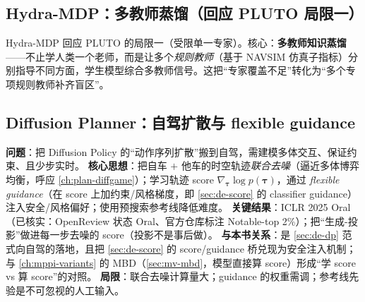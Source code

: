 \subsection{Hydra-MDP：多教师蒸馏（回应 PLUTO 局限一）}
\label{sec:de-hydra}

Hydra-MDP\cite{li2024hydramdp} 回应 PLUTO 的局限一（受限单一专家）。核心：\textbf{多教师知识蒸馏}——不止学人类一个老师，而是让多个\emph{规则教师}（基于 NAVSIM 仿真子指标）分别指导不同方面，学生模型综合多教师信号。这把“专家覆盖不足”转化为“多个专项规则教师补齐盲区”。

\subsection{Diffusion Planner：自驾扩散与 flexible guidance}
\label{sec:de-diffplanner}

\begin{paper}\label{paper:de-diffplanner}
\textbf{问题}：把 Diffusion Policy 的“动作序列扩散”搬到自驾，需建模多体交互、保证约束、且少步实时。
\textbf{核心思想}\cite{zheng2025diffplanner}：把自车 $+$ 他车的时空轨迹\emph{联合去噪}（逼近多体博弈均衡，呼应 \cref{ch:plan-diffgame}）；学习轨迹 score $\nabla_{\boldsymbol{\tau}}\log p(\boldsymbol{\tau})$，通过 \emph{flexible guidance}（在 score 上加约束/风格梯度，即 \cref{sec:de-score} 的 classifier guidance）注入安全/风格偏好；使用预搜索参考线降低难度。
\textbf{关键结果}：ICLR 2025 Oral（已核实：OpenReview 状态 Oral、官方仓库标注 Notable-top 2\%）；把“生成-投影”做进每一步去噪的 score（投影不是事后做）。
\textbf{与本书关系}：是 \cref{sec:de-dp} 范式向自驾的落地，且把 \cref{sec:de-score} 的 score/guidance 桥兑现为安全注入机制；与 \cref{ch:mppi-variants} 的 MBD（\cref{sec:mv-mbd}，模型直接算 score）形成“学 score vs 算 score”的对照。
\textbf{局限}：联合去噪计算量大；guidance 的权重需调；参考线先验是不可忽视的人工输入。
\end{paper}

